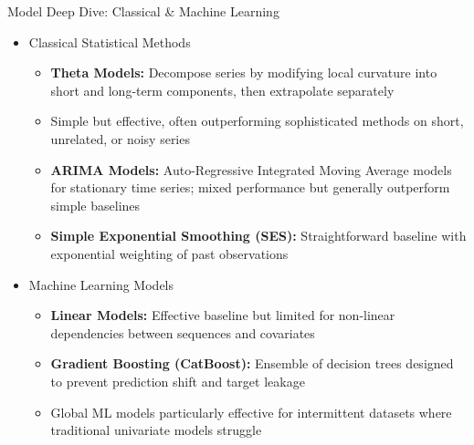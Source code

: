 \documentclass[ignorenonframetext, 9pt]{beamer}
\begin{document}
\begin{frame}{Model Deep Dive: Classical \& Machine Learning}
\begin{itemize}
    \item \alert{Classical Statistical Methods}
    \begin{itemize}
        \item \textbf{Theta Models:} Decompose series by modifying local curvature into short and long-term components, then extrapolate separately
        \vspace{0.2cm}
        \item Simple but effective, often outperforming sophisticated methods on short, unrelated, or noisy series
        \vspace{0.2cm}
        \item \textbf{ARIMA Models:} Auto-Regressive Integrated Moving Average models for stationary time series; mixed performance but generally outperform simple baselines
        \vspace{0.2cm}
        \item \textbf{Simple Exponential Smoothing (SES):} Straightforward baseline with exponential weighting of past observations
    \end{itemize}
    \vspace{0.3cm}
    \item \alert{Machine Learning Models}
    \begin{itemize}
        \item \textbf{Linear Models:} Effective baseline but limited for non-linear dependencies between sequences and covariates
        \vspace{0.2cm}
        \item \textbf{Gradient Boosting (CatBoost):} Ensemble of decision trees designed to prevent prediction shift and target leakage
        \vspace{0.2cm}
        \item Global ML models particularly effective for intermittent datasets where traditional univariate models struggle
    \end{itemize}
\end{itemize}
\end{frame}
\end{document}
